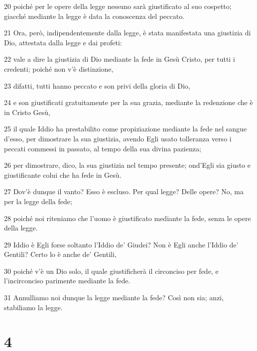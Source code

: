 \par 20 poiché per le opere della legge nessuno sarà giustificato al suo cospetto; giacché mediante la legge è data la conoscenza del peccato.
\par 21 Ora, però, indipendentemente dalla legge, è stata manifestata una giustizia di Dio, attestata dalla legge e dai profeti:
\par 22 vale a dire la giustizia di Dio mediante la fede in Gesù Cristo, per tutti i credenti; poiché non v'è distinzione,
\par 23 difatti, tutti hanno peccato e son privi della gloria di Dio,
\par 24 e son giustificati gratuitamente per la sua grazia, mediante la redenzione che è in Cristo Gesù,
\par 25 il quale Iddio ha prestabilito come propiziazione mediante la fede nel sangue d'esso, per dimostrare la sua giustizia, avendo Egli usato tolleranza verso i peccati commessi in passato, al tempo della sua divina pazienza;
\par 26 per dimostrare, dico, la sua giustizia nel tempo presente; ond'Egli sia giusto e giustificante colui che ha fede in Gesù.
\par 27 Dov'è dunque il vanto? Esso è escluso. Per qual legge? Delle opere? No, ma per la legge della fede;
\par 28 poiché noi riteniamo che l'uomo è giustificato mediante la fede, senza le opere della legge.
\par 29 Iddio è Egli forse soltanto l'Iddio de' Giudei? Non è Egli anche l'Iddio de' Gentili? Certo lo è anche de' Gentili,
\par 30 poiché v'è un Dio solo, il quale giustificherà il circonciso per fede, e l'incirconciso parimente mediante la fede.
\par 31 Annulliamo noi dunque la legge mediante la fede? Così non sia; anzi, stabiliamo la legge.

\chapter{4}

